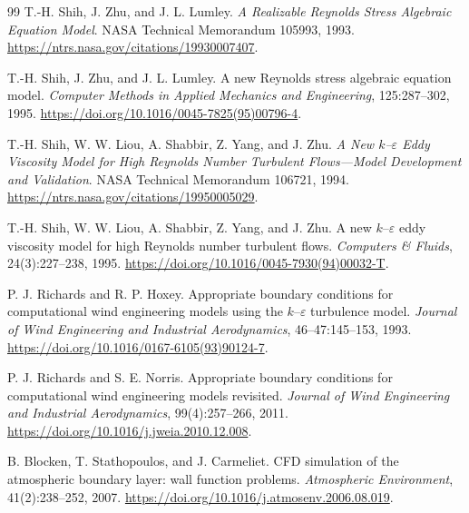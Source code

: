 \documentclass[11pt,a4paper]{article}
\numberwithin{equation}{section}
\newcommand{\eps}{\varepsilon}
\begin{document}
\clearpage
{}
{}
\begin{thebibliography}{99}
T.-H. Shih, J. Zhu, and J. L. Lumley.
\newblock \emph{A Realizable Reynolds Stress Algebraic Equation Model}.
\newblock NASA Technical Memorandum 105993, 1993.
\newblock \url{https://ntrs.nasa.gov/citations/19930007407}.

T.-H. Shih, J. Zhu, and J. L. Lumley.
\newblock A new Reynolds stress algebraic equation model.
\newblock \emph{Computer Methods in Applied Mechanics and Engineering},
125:287--302, 1995.
\newblock \url{https://doi.org/10.1016/0045-7825(95)00796-4}.

T.-H. Shih, W. W. Liou, A. Shabbir, Z. Yang, and J. Zhu.
\newblock \emph{A New $k$--$\eps$ Eddy Viscosity Model for High Reynolds
Number Turbulent Flows---Model Development and Validation}.
\newblock NASA Technical Memorandum 106721, 1994.
\newblock \url{https://ntrs.nasa.gov/citations/19950005029}.

T.-H. Shih, W. W. Liou, A. Shabbir, Z. Yang, and J. Zhu.
\newblock A new $k$--$\eps$ eddy viscosity model for high Reynolds number
turbulent flows.
\newblock \emph{Computers \& Fluids}, 24(3):227--238, 1995.
\newblock \url{https://doi.org/10.1016/0045-7930(94)00032-T}.

P. J. Richards and R. P. Hoxey.
\newblock Appropriate boundary conditions for computational wind engineering
models using the $k$--$\eps$ turbulence model.
\newblock \emph{Journal of Wind Engineering and Industrial Aerodynamics},
46--47:145--153, 1993.
\newblock \url{https://doi.org/10.1016/0167-6105(93)90124-7}.

P. J. Richards and S. E. Norris.
\newblock Appropriate boundary conditions for computational wind engineering
models revisited.
\newblock \emph{Journal of Wind Engineering and Industrial Aerodynamics},
99(4):257--266, 2011.
\newblock \url{https://doi.org/10.1016/j.jweia.2010.12.008}.

B. Blocken, T. Stathopoulos, and J. Carmeliet.
\newblock CFD simulation of the atmospheric boundary layer:
wall function problems.
\newblock \emph{Atmospheric Environment}, 41(2):238--252, 2007.
\newblock \url{https://doi.org/10.1016/j.atmosenv.2006.08.019}.


\end{thebibliography}
\end{document}
